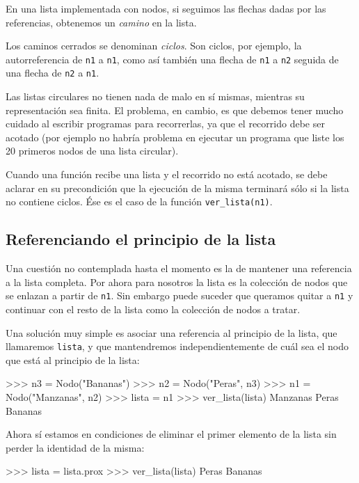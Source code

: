 En una lista implementada con nodos, si seguimos las flechas
dadas por las referencias, obtenemos un \emph{camino} en la lista.

Los caminos cerrados se denominan \emph{ciclos}. Son ciclos, por ejemplo, la
autorreferencia de \lstinline|n1| a \lstinline|n1|, como así también una
flecha de \lstinline|n1| a \lstinline|n2| seguida de una flecha de
\lstinline|n2| a \lstinline|n1|.

\begin{atencion}
Las listas circulares no tienen nada de malo en sí mismas,
mientras su representación sea finita. El problema, en cambio, es que debemos tener
mucho cuidado al escribir programas para recorrerlas, ya que el recorrido
debe ser acotado (por ejemplo no habría problema en ejecutar un programa
que liste los 20 primeros nodos de una lista circular).

Cuando una función recibe una lista y el recorrido no está acotado,
se debe aclarar en su precondición que la ejecución de la misma terminará
sólo si la lista no contiene ciclos. Ése es el caso de la función
\lstinline|ver_lista(n1)|.
\end{atencion}

\subsection{Referenciando el principio de la lista}

Una cuestión no contemplada hasta el momento es la de mantener una referencia
a la lista completa. Por ahora para nosotros la lista es la colección de nodos
que se enlazan a partir de \lstinline|n1|. Sin embargo puede suceder que queramos
quitar a \lstinline|n1| y continuar con el resto de la lista como la colección de
nodos a tratar.

Una solución muy simple es asociar una referencia al principio de la lista,
que llamaremos \lstinline|lista|, y que mantendremos independientemente de cuál sea
el nodo que está al principio de la lista:

\begin{codigo-python-sn}
>>> n3 = Nodo("Bananas")
>>> n2 = Nodo("Peras", n3)
>>> n1 = Nodo("Manzanas", n2)
>>> lista = n1
>>> ver_lista(lista)
Manzanas
Peras
Bananas
\end{codigo-python-sn}

Ahora sí estamos en condiciones de eliminar el primer elemento de la lista
sin perder la identidad de la misma:

\begin{codigo-python-sn}
>>> lista = lista.prox
>>> ver_lista(lista)
Peras
Bananas
\end{codigo-python-sn}

